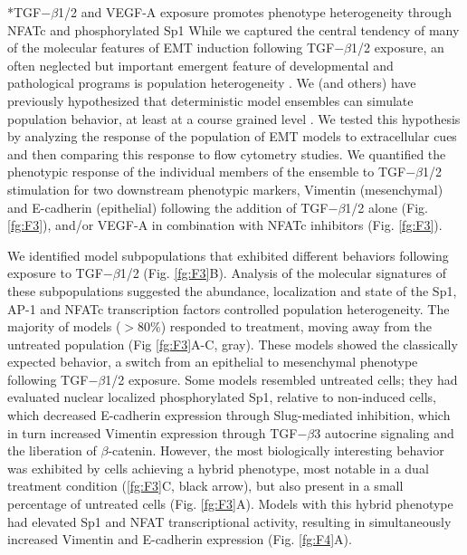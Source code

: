\documentclass[12pt]{article}
\makeatletter
\renewcommand\subsection{\@startsection
	{subsection}{2}{0mm}
	{-0.05in}
	{-0.5\baselineskip}
	{\normalfont\normalsize\bfseries}}
\makeatother
\begin{document}
\clearpage

\subsection*{TGF$-\beta$1/2 and VEGF-A exposure promotes phenotype heterogeneity through NFATc and phosphorylated Sp1}
While we captured the central tendency of many of the molecular features of EMT induction following TGF$-\beta$1/2 exposure, an often neglected but important emergent
feature of developmental and pathological programs is population heterogeneity \citep{Park:2010fu}.
We (and others) have previously hypothesized that deterministic model ensembles can simulate population behavior, at least at a course grained level \citep{Lequieu:2011fj}.
We tested this hypothesis by analyzing the response of the population of EMT models to extracellular cues and then comparing this response to flow cytometry studies.
We quantified the phenotypic response of the individual members of the ensemble to TGF$-\beta$1/2 stimulation for two downstream phenotypic markers, Vimentin (mesenchymal) and E-cadherin (epithelial) following the addition of TGF$-\beta$1/2 alone (Fig. \ref{fg:F3}), and/or VEGF-A in combination with NFATc inhibitors (Fig. \ref{fg:F3}).

We identified model subpopulations that exhibited different behaviors following exposure to TGF$-\beta$1/2 (Fig. \ref{fg:F3}B).
Analysis of the molecular signatures of these subpopulations suggested the abundance, localization and state of the Sp1, AP-1 and NFATc transcription factors controlled population heterogeneity.
The majority of models ($>$80\%) responded to treatment, moving away from the untreated population (Fig \ref{fg:F3}A-C, gray).
These models showed the classically expected behavior, a switch from an epithelial to mesenchymal phenotype following TGF$-\beta$1/2 exposure.
Some models resembled untreated cells; they had evaluated nuclear localized phosphorylated Sp1, relative to non-induced cells,
which decreased E-cadherin expression through Slug-mediated inhibition, which in turn increased Vimentin expression through TGF$-\beta$3 autocrine signaling and the liberation of $\beta$-catenin. However, the most biologically interesting behavior was exhibited by cells achieving a hybrid phenotype, most notable in a dual treatment condition (\ref{fg:F3}C, black arrow), but also present in a small percentage of untreated cells (Fig. \ref{fg:F3}A).
Models with this hybrid phenotype had elevated Sp1 and NFAT transcriptional activity, resulting in simultaneously increased Vimentin and E-cadherin expression (Fig. \ref{fg:F4}A).
\end{document}
